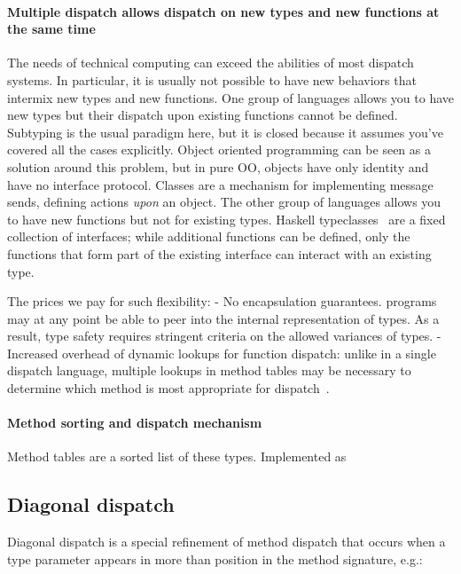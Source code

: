 \documentclass[pldi]{sigplanconf-pldi15}
\begin{document}
\paragraph{Multiple dispatch allows dispatch on new types and new functions at the same time}
The needs of technical computing can exceed the abilities of most dispatch
systems.  In particular, it is usually not possible to have new behaviors that
intermix new types and new functions.  One group of languages allows you to
have new types but their dispatch upon existing functions cannot be defined.
Subtyping is the usual paradigm here, but it is closed because it assumes
you've covered all the cases explicitly.  Object oriented programming can be
seen as a solution around this problem, but in pure OO, objects have only
identity and have no interface protocol.  Classes are a mechanism for
implementing message sends, defining actions \textit{upon} an object.  The
other group of languages allows you to have new functions but not for existing
types.  Haskell typeclasses~\cite{typeclass} are a fixed collection of
interfaces; while additional functions can be defined, only the functions that
form part of the existing interface can interact with an existing type.

The prices we pay for such flexibility:
- No encapsulation guarantees.  programs may at any point be able to peer into
the internal representation of types. As a result, type safety requires
stringent criteria on the allowed variances of types.
- Increased overhead of dynamic lookups for function dispatch: unlike in a single dispatch language, multiple lookups in method tables may be necessary to determine which method is most appropriate for dispatch~\cite{Bruce1995}.


\paragraph{Method sorting and dispatch mechanism}
Method tables are a sorted list of these types.
Implemented as 

\subsection{Diagonal dispatch}

Diagonal dispatch is a special refinement of method dispatch that occurs when a
type parameter appears in more than position in the method signature, e.g.:
\end{document}
